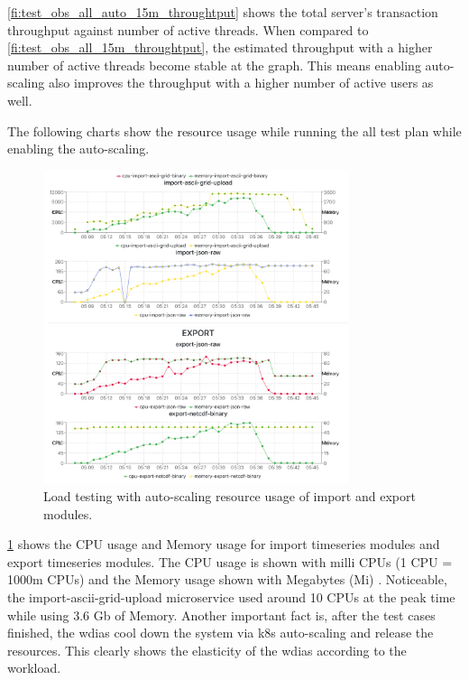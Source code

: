 \cref{fi:test_obs_all_auto_15m_throughtput} shows the total server's transaction throughput against number of active threads.
When compared to \cref{fi:test_obs_all_15m_throughtput}, the estimated throughput with a higher number of active threads become stable at the graph. This means enabling auto-scaling also improves the throughput with a higher number of active users as well.

The following charts show the resource usage while running the all test plan while enabling the auto-scaling.
\begin{figure}[htp]
    \centering
    \includegraphics[width=0.8\textwidth]{results/obs/all_auto/obs_all_auto_15m_import_export_res.png}
    \caption{Load testing with auto-scaling resource usage of import and export modules.}
    \label{fi:obs_all_auto_15m_import_export_res}
\end{figure}

\cref{fi:obs_all_auto_15m_import_export_res} shows the CPU usage and Memory usage for import timeseries modules and export timeseries modules. The CPU usage is shown with milli CPUs \cite{LinuxFoundationManagingKubernetes} (1 CPU = 1000m CPUs) and the Memory usage shown with Megabytes (Mi) \cite{LinuxFoundationManagingKubernetes}. Noticeable, the import-ascii-grid-upload microservice used around 10 CPUs at the peak time while using 3.6 Gb of Memory. Another important fact is, after the test cases finished, the \acrshort{wdias} cool down the system via \acrshort{k8s} auto-scaling and release the resources. This clearly shows the elasticity of the \acrshort{wdias} according to the workload.

